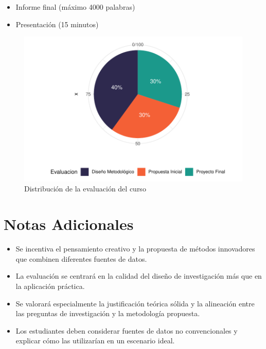 \documentclass[11pt,letter,]{article}
\makeatletter
\providecommand{\tightlist}{%
  \setlength{\itemsep}{0pt}\setlength{\parskip}{0pt}}
\def\maxwidth{\ifdim\Gin@nat@width>\linewidth\linewidth
\else\Gin@nat@width\fi}
\let\Oldincludegraphics\includegraphics
\renewcommand{\includegraphics}[1]{\Oldincludegraphics[width=\maxwidth]{#1}}
\makeatother
\begin{document}
\begin{itemize}
\tightlist
\item
  Informe final (máximo 4000 palabras)
\item
  Presentación (15 minutos)
\end{itemize}

\begin{figure}

{\centering \includegraphics{programa_files/figure-pdf/unnamed-chunk-1-1.pdf}

}

\caption{Distribución de la evaluación del curso}

\end{figure}

\hypertarget{notas-adicionales}{%
\section{Notas Adicionales}\label{notas-adicionales}}

\begin{tcolorbox}[enhanced jigsaw, coltitle=black, rightrule=.15mm, breakable, opacitybacktitle=0.6, opacityback=0, bottomrule=.15mm, colback=white, arc=.35mm, colbacktitle=quarto-callout-note-color!10!white, left=2mm, toprule=.15mm, titlerule=0mm, bottomtitle=1mm, toptitle=1mm, leftrule=.75mm, title=\textcolor{quarto-callout-note-color}{\faInfo}\hspace{0.5em}{Note}, colframe=quarto-callout-note-color-frame]

\begin{itemize}
\tightlist
\item
  Se incentiva el pensamiento creativo y la propuesta de métodos
  innovadores que combinen diferentes fuentes de datos.
\item
  La evaluación se centrará en la calidad del diseño de investigación
  más que en la aplicación práctica.
\item
  Se valorará especialmente la justificación teórica sólida y la
  alineación entre las preguntas de investigación y la metodología
  propuesta.
\item
  Los estudiantes deben considerar fuentes de datos no convencionales y
  explicar cómo las utilizarían en un escenario ideal.
\end{itemize}

\end{tcolorbox}
\end{document}
